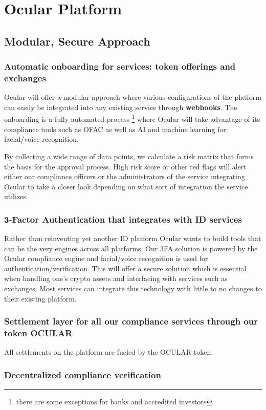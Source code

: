 \documentclass[a4paper]{article}
\begin{document}
\section{Ocular Platform}
\subsection{Modular, Secure Approach}
\subsubsection*{Automatic onboarding for services: token offerings and exchanges}
Ocular will offer a modular approach where various configurations of the platform can easily be integrated into any existing service through \textbf{webhooks}. The onboarding is a fully automated process \footnote{there are some exceptions for banks and accredited investors} where Ocular will take advantage of its compliance tools such as OFAC as well as AI and machine learning for facial/voice recognition. 

By collecting a wide range of data points, we calculate a risk matrix that forms the basis for the approval process. High risk score or other red flags will alert either our compliance officers or the administrators of the service integrating Ocular to take a closer look depending on what sort of integration the service utilizes.

\subsubsection*{3-Factor Authentication that integrates with ID services}
Rather than reinventing yet another ID platform Ocular wants to build tools that can be the very engines across all platforms. Our 3FA solution is powered by the Ocular compliance engine and facial/voice recognition is used for authentication/verification. This will offer a secure solution which is essential when handling one's crypto assets and interfacing with services such as exchanges. Most services can integrate this technology with little to no changes to their existing platform. 


\subsubsection*{Settlement layer for all our compliance services through our token OCULAR}
All settlements on the platform are fueled by the OCULAR token. 

\subsubsection*{Decentralized compliance verification}
\end{document}
